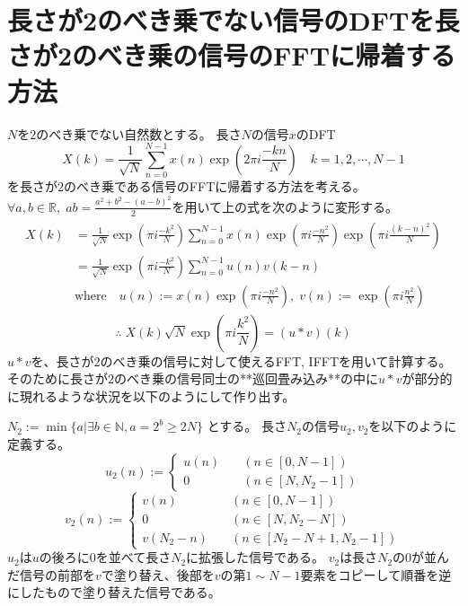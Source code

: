 			\section{長さが2のべき乗でない信号のDFTを長さが2のべき乗の信号のFFTに帰着する方法}
				$N$を$2$のべき乗でない自然数とする。
				長さ$N$の信号$x$のDFT
				\[ X(k) = \frac{1}{\sqrt{N}} \sum_{n=0}^{N-1} x(n)\exp \left(2\pi i\frac{-kn}{N}\right) \quad k=1,2,\cdots,N-1 \]
				を長さが$2$のべき乗である信号のFFTに帰着する方法を考える。
				$\forall a,b\in\mathbb{R},\;ab = \frac{a^2 + b^2 - (a-b)^2}{2}$を用いて上の式を次のように変形する。
				\begin{align*}
					\begin{aligned}
						X(k) &= \frac{1}{\sqrt{N}} \exp \left(\pi i\frac{-k^2}{N}\right) \sum_{n=0}^{N-1} x(n)\exp \left(\pi i\frac{-n^2}{N}\right) \exp \left(\pi i\frac{(k-n)^2}{N}\right) \\
						&= \frac{1}{\sqrt{N}} \exp \left(\pi i\frac{-k^2}{N}\right) \sum_{n=0}^{N-1} u(n)v(k-n) \\
						& \text{where} \quad u(n) := x(n)\exp \left(\pi i\frac{-n^2}{N}\right),\;v(n) := \exp \left(\pi i\frac{n^2}{N}\right)
					\end{aligned}
				\end{align*}
				\[ \therefore\; X(k)\sqrt{N} \exp \left(\pi i\frac{k^2}{N}\right) = (u*v)(k) \]
				$u*v$を、長さが$2$のべき乗の信号に対して使えるFFT, IFFTを用いて計算する。
				そのために長さが$2$のべき乗の信号同士の**巡回畳み込み**の中に$u*v$が部分的に現れるような状況を以下のようにして作り出す。
				\par
				$N_2 := \min\{a|\exists b\in \mathbb{N}, a = 2^b \geq 2N\}$ とする。
				長さ$N_2$の信号$u_2,v_2$を以下のように定義する。
				\[
					u_2(n) := \left\{
						\begin{aligned}
							u(n) &\quad (n \in [0,N-1]) \\
							0 &\quad (n \in [N,N_2-1])
						\end{aligned}
					\right.
				\]
				\[
					v_2(n) := \left\{
						\begin{aligned}
							v(n) &\quad (n \in [0,N-1]) \\
							0 &\quad (n\in [N,N_2-N]) \\
							v(N_2-n) &\quad (n \in [N_2-N+1,N_2-1])
						\end{aligned}
					\right.
				\]
				$u_2$は$u$の後ろに$0$を並べて長さ$N_2$に拡張した信号である。
				$v_2$は長さ$N_2$の$0$が並んだ信号の前部を$v$で塗り替え、後部を$v$の第$1\sim N-1$要素をコピーして順番を逆にしたもので塗り替えた信号である。
